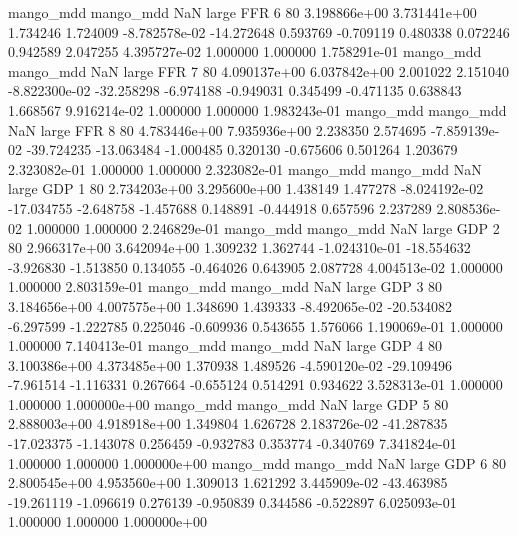 mango_mdd mango_mdd                   NaN      large      FFR                 6 80 3.198866e+00   3.731441e+00      1.734246       1.724009 -8.782578e-02    -14.272648      0.593769    -0.709119       0.480338  0.072246   0.942589     2.047255   4.395727e-02            1.000000        1.000000        1.758291e-01
mango_mdd mango_mdd                   NaN      large      FFR                 7 80 4.090137e+00   6.037842e+00      2.001022       2.151040 -8.822300e-02    -32.258298     -6.974188    -0.949031       0.345499 -0.471135   0.638843     1.668567   9.916214e-02            1.000000        1.000000        1.983243e-01
mango_mdd mango_mdd                   NaN      large      FFR                 8 80 4.783446e+00   7.935936e+00      2.238350       2.574695 -7.859139e-02    -39.724235    -13.063484    -1.000485       0.320130 -0.675606   0.501264     1.203679   2.323082e-01            1.000000        1.000000        2.323082e-01
mango_mdd mango_mdd                   NaN      large      GDP                 1 80 2.734203e+00   3.295600e+00      1.438149       1.477278 -8.024192e-02    -17.034755     -2.648758    -1.457688       0.148891 -0.444918   0.657596     2.237289   2.808536e-02            1.000000        1.000000        2.246829e-01
mango_mdd mango_mdd                   NaN      large      GDP                 2 80 2.966317e+00   3.642094e+00      1.309232       1.362744 -1.024310e-01    -18.554632     -3.926830    -1.513850       0.134055 -0.464026   0.643905     2.087728   4.004513e-02            1.000000        1.000000        2.803159e-01
mango_mdd mango_mdd                   NaN      large      GDP                 3 80 3.184656e+00   4.007575e+00      1.348690       1.439333 -8.492065e-02    -20.534082     -6.297599    -1.222785       0.225046 -0.609936   0.543655     1.576066   1.190069e-01            1.000000        1.000000        7.140413e-01
mango_mdd mango_mdd                   NaN      large      GDP                 4 80 3.100386e+00   4.373485e+00      1.370938       1.489526 -4.590120e-02    -29.109496     -7.961514    -1.116331       0.267664 -0.655124   0.514291     0.934622   3.528313e-01            1.000000        1.000000        1.000000e+00
mango_mdd mango_mdd                   NaN      large      GDP                 5 80 2.888003e+00   4.918918e+00      1.349804       1.626728  2.183726e-02    -41.287835    -17.023375    -1.143078       0.256459 -0.932783   0.353774    -0.340769   7.341824e-01            1.000000        1.000000        1.000000e+00
mango_mdd mango_mdd                   NaN      large      GDP                 6 80 2.800545e+00   4.953560e+00      1.309013       1.621292  3.445909e-02    -43.463985    -19.261119    -1.096619       0.276139 -0.950839   0.344586    -0.522897   6.025093e-01            1.000000        1.000000        1.000000e+00
